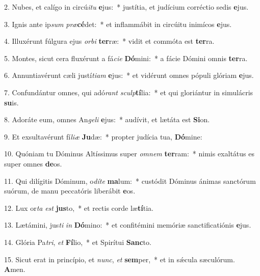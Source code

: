 2. Nubes, et calígo in circú\textit{i}\textit{tu} \textbf{e}jus:~*  justítia, et judícium corréctio sedis \textbf{e}jus.\

3. Ignis ante ip\textit{sum} \textit{præ}\textbf{cé}det:~*  et inflammábit in circúitu inimícos \textbf{e}jus.\

4. Illuxérunt fúlgura ejus \textit{or}\textit{bi} \textbf{ter}ræ:~*  vidit et commóta est \textbf{ter}ra.\

5. Montes, sicut cera fluxérunt a fá\textit{ci}\textit{e} \textbf{Dó}mini:~*  a fácie Dómini omnis \textbf{ter}ra.\

6. Annuntiavérunt cæli justí\textit{ti}\textit{am} \textbf{e}jus:~*  et vidérunt omnes pópuli glóriam \textbf{e}jus.\

7. Confundántur omnes, qui adó\textit{rant} \textit{sculp}\textbf{tí}lia:~*  et qui gloriántur in simulácris \textbf{su}is.\

8. Adoráte eum, omnes An\textit{ge}\textit{li} \textbf{e}jus:~*  audívit, et lætáta est \textbf{Si}on.\

9. Et exsultavérunt fí\textit{li}\textit{æ} \textbf{Ju}dæ:~*  propter judícia tua, \textbf{Dó}mine:\

10. Quóniam tu Dóminus Altíssimus super \textit{om}\textit{nem} \textbf{ter}ram:~*  nimis exaltátus es super omnes \textbf{de}os.\

11. Qui dilígitis Dóminum, o\textit{dí}\textit{te} \textbf{ma}lum:~*  custódit Dóminus ánimas sanctórum suórum, de manu peccatóris liberábit \textbf{e}os.\

12. Lux or\textit{ta} \textit{est} \textbf{jus}to,~*  et rectis corde læ\textbf{tí}tia.\

13. Lætámini, jus\textit{ti} \textit{in} \textbf{Dó}mino:~*  et confitémini memóriæ sanctificatiónis \textbf{e}jus.\

14. Glória Pa\textit{tri}, \textit{et} \textbf{Fí}lio,~*  et Spirítui \textbf{Sanc}to.\

15. Sicut erat in princípio, et \textit{nunc}, \textit{et} \textbf{sem}per,~*  et in sǽcula sæculórum. \textbf{A}men.\

